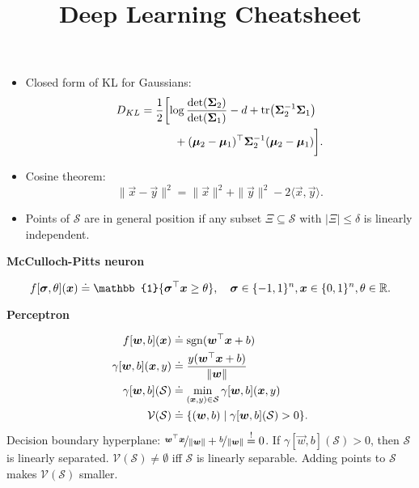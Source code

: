 \documentclass[10pt]{article}
\title{Deep Learning Cheatsheet}
\newenvironment{topic}[1]
{\textbf{\sffamily \colorbox{black}{\rlap{\textbf{\textcolor{white}{#1}}}\hspace{\linewidth}\hspace{-2\fboxsep}}}}
{}
\newenvironment{subtopic}[1]
{\begin{center}\textbf{\sffamily #1}\end{center}}
{}
\begin{document}
\setlength{\columnsep}{0.25cm}

\begin{multicols*}{3}

    \scriptsize

    \begin{itemize}
        \item Closed form of KL for Gaussians:
            \begin{align*}
                D_{KL} & = \frac{1}{2} \biggl[ \log \frac{\det{\mat{\Sigma}_2}}{\det{\mat{\Sigma}_1}} - d + \tr{\inv{\mat{\Sigma}_2} \mat{\Sigma}_1} \\
                    & \quad \quad \quad + \transpose{(\vec{\mu}_2 - \vec{\mu}_1)} \inv{\mat{\Sigma}_2} (\vec{\mu}_2 - \vec{\mu}_1) \biggr].
            \end{align*}
        \item Cosine theorem: \[
                \| \vec{x}-\vec{y} \|^2 = \| \vec{x} \|^2 + \| \vec{y} \|^2 - 2\langle \vec{x},\vec{y} \rangle.
            \]
        \item Points of $\mathcal{S}$ are in general position if any subset $\Xi \subseteq \mathcal{S}$ with $|\Xi| \leq \delta$ is linearly independent.
    \end{itemize}

    \begin{topic}{Connectionism}

        \begin{subtopic}{McCulloch-Pitts neuron}
            \[
                f[\vec{\sigma},\theta](\vec{x}) \doteq \mathbb{1}\{ \transpose{\vec{\sigma}}\vec{x} \geq \theta \}, \quad \vec{\sigma} \in \{ -1,1 \}^n, \vec{x} \in \{ 0,1 \}^n, \theta \in \R.
            \]
        \end{subtopic}

        \begin{subtopic}{Perceptron}
            \begin{align*}
                f[\bm{w},b](\bm{x})          & \doteq \mathrm{sgn}(\bm{w}^\top\bm{x} + b)                    \\
                \gamma[\bm{w},b](\bm{x},y)   & \doteq \frac{y (\bm{w}^\top\bm{x} + b)}{\| \bm{w} \|}        \\
                \gamma[\bm{w},b](\mathcal{S}) & \doteq \min_{(\bm{x},y) \in \mathcal{S}} \gamma[\bm{w},b](\bm{x},y) \\
                \mathcal{V}(\mathcal{S})       & \doteq \{ (\bm{w},b) \mid \gamma[\bm{w},b](\mathcal{S}) > 0 \}.
            \end{align*}
            Decision boundary hyperplane: $\nicefrac{\bm{w}^\top \bm{x}}{\| \bm{w} \|} + \nicefrac{b}{\| \bm{w} \|}
                \overset{!}{=} 0$. If $\gamma[\vec{w},b](\mathcal{S}) > 0$, then $\mathcal{S}$ is
            linearly separated. $\mathcal{V}(\mathcal{S}) \neq \emptyset$ iff $\mathcal{S}$ is
            linearly separable. Adding points to $\mathcal{S}$ makes $\mathcal{V}(\mathcal{S})$ smaller.


\end{subtopic}
\end{topic}
\end{multicols*}
\end{document}
